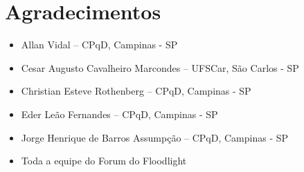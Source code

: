 \chapter{Agradecimentos}

\begin{itemize}
\item Allan Vidal -- CPqD, Campinas - SP
\item Cesar Augusto Cavalheiro Marcondes -- UFSCar, 
São Carlos - SP
\item Christian Esteve Rothenberg -- CPqD, Campinas - SP
\item Eder Leão Fernandes -- CPqD, Campinas - SP
\item Jorge Henrique de Barros Assumpção -- CPqD, Campinas - SP
\item Toda a equipe do Forum do Floodlight
\end{itemize}
